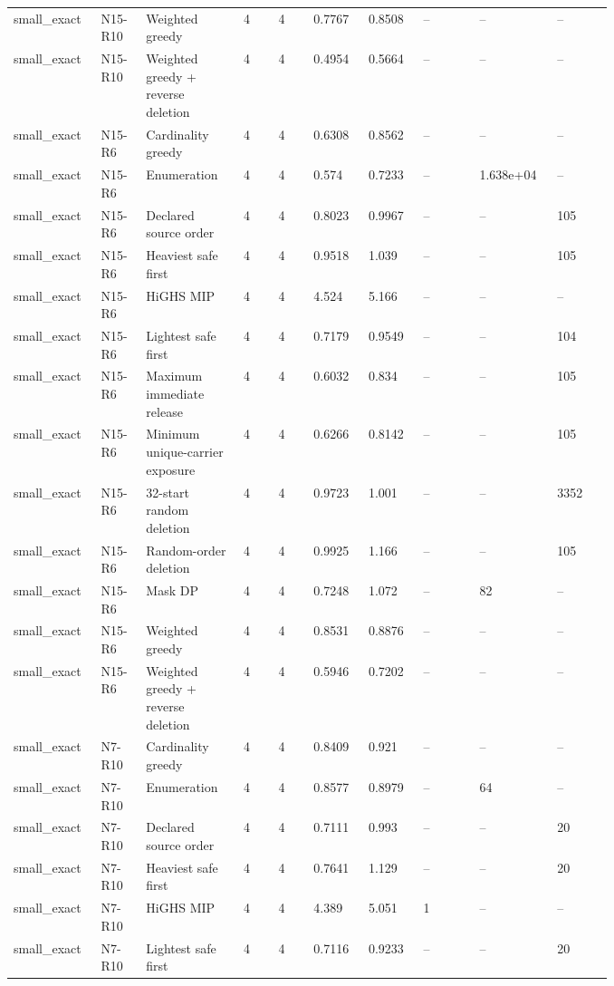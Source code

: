{\begin{longtable}{p{0.07\linewidth}p{0.06\linewidth}p{0.13\linewidth}p{0.055\linewidth}p{0.055\linewidth}p{0.075\linewidth}p{0.075\linewidth}p{0.085\linewidth}p{0.085\linewidth}p{0.085\linewidth}}
small\_exact & N15-R10 & Weighted greedy & 4 & 4 & 0.7767 & 0.8508 & -- & -- & -- \\
small\_exact & N15-R10 & Weighted greedy + reverse deletion & 4 & 4 & 0.4954 & 0.5664 & -- & -- & -- \\
small\_exact & N15-R6 & Cardinality greedy & 4 & 4 & 0.6308 & 0.8562 & -- & -- & -- \\
small\_exact & N15-R6 & Enumeration & 4 & 4 & 0.574 & 0.7233 & -- & 1.638e+04 & -- \\
small\_exact & N15-R6 & Declared source order & 4 & 4 & 0.8023 & 0.9967 & -- & -- & 105 \\
small\_exact & N15-R6 & Heaviest safe first & 4 & 4 & 0.9518 & 1.039 & -- & -- & 105 \\
small\_exact & N15-R6 & HiGHS MIP & 4 & 4 & 4.524 & 5.166 & -- & -- & -- \\
small\_exact & N15-R6 & Lightest safe first & 4 & 4 & 0.7179 & 0.9549 & -- & -- & 104 \\
small\_exact & N15-R6 & Maximum immediate release & 4 & 4 & 0.6032 & 0.834 & -- & -- & 105 \\
small\_exact & N15-R6 & Minimum unique-carrier exposure & 4 & 4 & 0.6266 & 0.8142 & -- & -- & 105 \\
small\_exact & N15-R6 & 32-start random deletion & 4 & 4 & 0.9723 & 1.001 & -- & -- & 3352 \\
small\_exact & N15-R6 & Random-order deletion & 4 & 4 & 0.9925 & 1.166 & -- & -- & 105 \\
small\_exact & N15-R6 & Mask DP & 4 & 4 & 0.7248 & 1.072 & -- & 82 & -- \\
small\_exact & N15-R6 & Weighted greedy & 4 & 4 & 0.8531 & 0.8876 & -- & -- & -- \\
small\_exact & N15-R6 & Weighted greedy + reverse deletion & 4 & 4 & 0.5946 & 0.7202 & -- & -- & -- \\
small\_exact & N7-R10 & Cardinality greedy & 4 & 4 & 0.8409 & 0.921 & -- & -- & -- \\
small\_exact & N7-R10 & Enumeration & 4 & 4 & 0.8577 & 0.8979 & -- & 64 & -- \\
small\_exact & N7-R10 & Declared source order & 4 & 4 & 0.7111 & 0.993 & -- & -- & 20 \\
small\_exact & N7-R10 & Heaviest safe first & 4 & 4 & 0.7641 & 1.129 & -- & -- & 20 \\
small\_exact & N7-R10 & HiGHS MIP & 4 & 4 & 4.389 & 5.051 & 1 & -- & -- \\
small\_exact & N7-R10 & Lightest safe first & 4 & 4 & 0.7116 & 0.9233 & -- & -- & 20 \\

\end{longtable}}
